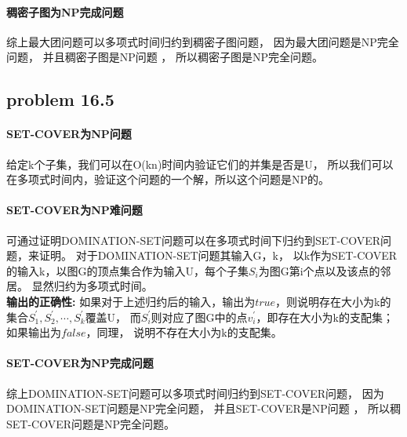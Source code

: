 \documentclass[11pt,a4paper,oneside,oldfontcommands]{ctexart}
\begin{document}
\paragraph*{稠密子图为NP完成问题}
综上最大团问题可以多项式时间归约到稠密子图问题，
因为最大团问题是NP完全问题，
并且稠密子图是NP问题 ，
所以稠密子图是NP完全问题。

{\subsection*{problem 16.5}}
\paragraph*{SET-COVER为NP问题}
给定k个子集，我们可以在O(kn)时间内验证它们的并集是否是U，
所以我们可以在多项式时间内，验证这个问题的一个解，所以这个问题是NP的。
\paragraph*{SET-COVER为NP难问题}
可通过证明DOMINATION-SET问题可以在多项式时间下归约到SET-COVER问题，来证明。
对于DOMINATION-SET问题其输入G，k，
以k作为SET-COVER的输入k，以图G的顶点集合作为输入U，每个子集$S_i$为图G第i个点以及该点的邻居。
显然归约为多项式时间。\\
\hspace*{20pt}\textbf{输出的正确性: }
如果对于上述归约后的输入，输出为$true$，则说明存在大小为k的集合$S_1^{'},S_2^{'},\cdots,S_k^{'}$覆盖U，
而$S_i^{'}$则对应了图G中的点$v_i^{'}$，即存在大小为k的支配集；如果输出为$false$，同理，
说明不存在大小为k的支配集。
\paragraph*{SET-COVER为NP完成问题}
综上DOMINATION-SET问题可以多项式时间归约到SET-COVER问题，
因为DOMINATION-SET问题是NP完全问题，
并且SET-COVER是NP问题 ，
所以稠SET-COVER问题是NP完全问题。
\end{document}

